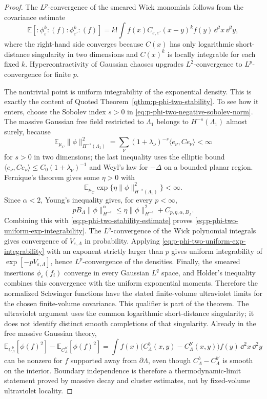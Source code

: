 \begin{proof}
The \(L^p\)-convergence of the smeared Wick monomials follows from the
covariance estimate
\[
  \mathbb E[
    :\!\phi_\varepsilon^k\!:(f)
    :\!\phi_{\varepsilon'}^k\!:(f)]
  =
  k!\int f(x)C_{\varepsilon,\varepsilon'}(x-y)^k f(y)\,\dd^2x\,\dd^2y ,
\]
where the right-hand side converges because \(C(x)\) has only logarithmic
short-distance singularity in two dimensions and \(C(x)^k\) is locally
integrable for each fixed \(k\).  Hypercontractivity of Gaussian chaoses
upgrades \(L^2\)-convergence to \(L^p\)-convergence for finite \(p\).

The nontrivial point is uniform integrability of the exponential density.
This is exactly the content of
Quoted Theorem~\ref{qthm:p-phi-two-stability}.  To see how it enters, choose
the Sobolev index \(s>0\) in
\eqref{eq:p-phi-two-negative-sobolev-norm}.  The massive Gaussian free field
restricted to \(\Lambda_1\) belongs to \(H^{-s}(\Lambda_1)\) almost surely,
because
\[
  \mathbb E_{\mu_C}\|\phi\|_{H^{-s}(\Lambda_1)}^2
  =
  \sum_\nu(1+\lambda_\nu)^{-s}
  \langle e_\nu,Ce_\nu\rangle
  <\infty
\]
for \(s>0\) in two dimensions; the last inequality uses the elliptic bound
\(\langle e_\nu,Ce_\nu\rangle\leq C_0(1+\lambda_\nu)^{-1}\) and Weyl's law
for \(-\Delta\) on a bounded planar region.  Fernique's theorem gives some
\(\eta>0\) with
\[
  \mathbb E_{\mu_C}\exp\{
    \eta\|\phi\|_{H^{-s}(\Lambda_1)}^2
  \}<\infty .
\]
Since \(\alpha<2\), Young's inequality gives, for every \(p<\infty\),
\[
  pB_\Lambda \|\phi\|_{H^{-s}}^\alpha
  \leq
  \eta\|\phi\|_{H^{-s}}^2+C_{p,\eta,\alpha,B_\Lambda}.
\]
Combining this with \eqref{eq:p-phi-two-stability-estimate} proves
\eqref{eq:p-phi-two-uniform-exp-integrability}.  The
\(L^q\)-convergence of the Wick polynomial integrals gives convergence of
\(V_{\varepsilon,\Lambda}\) in probability.  Applying
\eqref{eq:p-phi-two-uniform-exp-integrability} with an exponent strictly
larger than \(p\) gives uniform integrability of
\(\exp[-pV_{\varepsilon,\Lambda}]\), hence \(L^p\)-convergence of the
densities.  Finally, the smeared insertions
\(\phi_\varepsilon(f_i)\) converge in every Gaussian \(L^q\) space, and
Holder's inequality combines this convergence with the uniform exponential
moments.  Therefore the normalized Schwinger functions have the stated
finite-volume ultraviolet limits for the chosen finite-volume covariance.
This qualifier is part of the theorem.  The ultraviolet argument uses the
common logarithmic short-distance singularity; it does not identify distinct
smooth completions of that singularity.  Already in the free massive Gaussian
theory,
\[
  \mathbb E_{C_\Lambda^b}[\phi(f)^2]
  -
  \mathbb E_{C_\Lambda^{b'}}[\phi(f)^2]
  =
  \int f(x)\bigl(C_\Lambda^b(x,y)-C_\Lambda^{b'}(x,y)\bigr)
    f(y)\,\dd^2x\,\dd^2y
\]
can be nonzero for \(f\) supported away from \(\partial\Lambda\), even though
\(C_\Lambda^b-C_\Lambda^{b'}\) is smooth on the interior.  Boundary
independence is therefore a thermodynamic-limit statement proved by massive
decay and cluster estimates, not by fixed-volume ultraviolet locality.
\end{proof}

